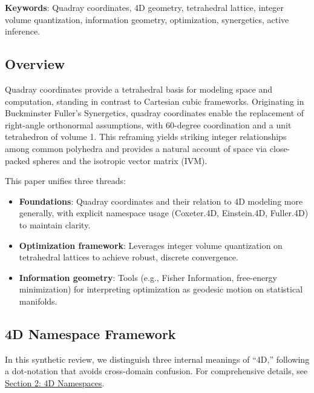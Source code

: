 \documentclass[
  10pt,
]{article}
\providecommand{\tightlist}{%
  \setlength{\itemsep}{0pt}\setlength{\parskip}{0pt}}
\begin{document}
\textbf{Keywords}: Quadray coordinates, 4D geometry, tetrahedral
lattice, integer volume quantization, information geometry,
optimization, synergetics, active inference.

\hypertarget{overview}{%
\subsection{Overview}\label{overview}}

Quadray coordinates provide a tetrahedral basis for modeling space and
computation, standing in contrast to Cartesian cubic frameworks.
Originating in Buckminster Fuller's Synergetics, quadray coordinates
enable the replacement of right-angle orthonormal assumptions, with
60-degree coordination and a unit tetrahedron of volume 1. This
reframing yields striking integer relationships among common polyhedra
and provides a natural account of space via close-packed spheres and the
isotropic vector matrix (IVM).

This paper unifies three threads:

\begin{itemize}
\tightlist
\item
  \textbf{Foundations}: Quadray coordinates and their relation to 4D
  modeling more generally, with explicit namespace usage (Coxeter.4D,
  Einstein.4D, Fuller.4D) to maintain clarity.
\item
  \textbf{Optimization framework}: Leverages integer volume quantization
  on tetrahedral lattices to achieve robust, discrete convergence.
\item
  \textbf{Information geometry}: Tools (e.g., Fisher Information,
  free-energy minimization) for interpreting optimization as geodesic
  motion on statistical manifolds.
\end{itemize}

\hypertarget{d-namespace-framework}{%
\subsection{4D Namespace Framework}\label{d-namespace-framework}}

In this synthetic review, we distinguish three internal meanings of
``4D,'' following a dot-notation that avoids cross-domain confusion. For
comprehensive details, see \href{02_4d_namespaces.md}{Section 2: 4D
Namespaces}.
\end{document}
